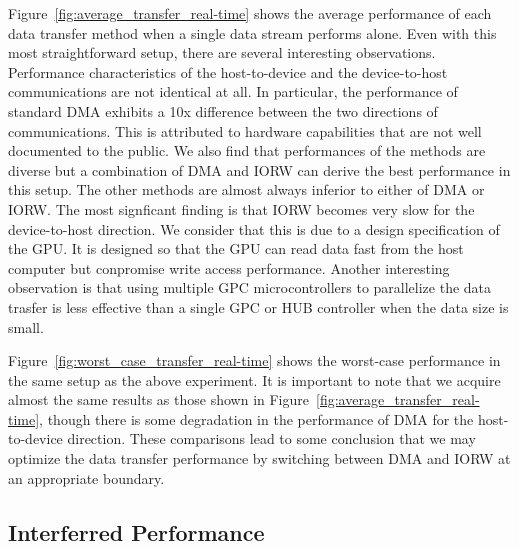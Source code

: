 Figure~\ref{fig:average_transfer_real-time} shows the average
performance of each data transfer method when a single data stream
performs alone.
Even with this most straightforward setup, there are several interesting
observations.
Performance characteristics of the host-to-device and the device-to-host
communications are not identical at all.
In particular, the performance of standard DMA exhibits a 10x difference
between the two directions of communications.
This is attributed to hardware capabilities that are not well documented
to the public.
We also find that performances of the methods are diverse but a
combination of \textsf{DMA} and \textsf{IORW} can derive the best
performance in this setup.
The other methods are almost always inferior to either of \textsf{DMA}
or \textsf{IORW}.
The most signficant finding is that \textsf{IORW} becomes very slow for
the device-to-host direction.
We consider that this is due to a design specification of the GPU.
It is designed so that the GPU can read data fast from the host computer
but conpromise write access performance.
Another interesting observation is that using multiple GPC
microcontrollers to parallelize the data trasfer is less effective than
a single GPC or HUB controller when the data size is small.

Figure~\ref{fig:worst_case_transfer_real-time} shows the worst-case
performance in the same setup as the above experiment.
It is important to note that we acquire almost the same results as those
shown in Figure~\ref{fig:average_transfer_real-time}, though there is
some degradation in the performance of \textsf{DMA} for the
host-to-device direction.
These comparisons lead to some conclusion that we may optimize the data
transfer performance by switching between \textsf{DMA} and \textsf{IORW}
at an appropriate boundary.

\subsection{Interferred Performance}

